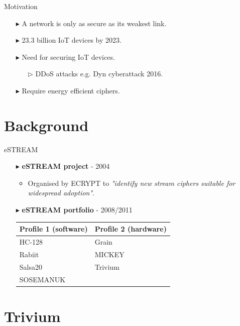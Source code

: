 \documentclass[10pt, compress]{beamer}
\begin{document}
\begin{frame}{Motivation}
\begin{itemize}[itemsep=0.5cm]
\item[$\blacktriangleright$] A network is only as secure as its weakest link.
\item[$\blacktriangleright$] 23.3 billion IoT devices by 2023.
\item[$\blacktriangleright$] Need for securing IoT devices.
\begin{itemize}[itemsep=0.25cm]
\item[$\triangleright$] DDoS attacks e.g. Dyn cyberattack 2016.
\end{itemize}
\item[$\blacktriangleright$] Require energy efficient ciphers.
\end{itemize}
\end{frame}

\section{Background}

\begin{frame}{eSTREAM}
\begin{itemize}[itemsep=0.5cm]
\item[$\blacktriangleright$] \textbf{eSTREAM project} - 2004
\begin{itemize}
\item Organised by ECRYPT to \textit{"identify new stream ciphers suitable for widespread adoption"}.
\end{itemize}
\item[$\blacktriangleright$] \textbf{eSTREAM portfolio} - 2008/2011
\begin{table}
\centering
\begin{tabular}{l|l}
Profile 1 (software) & Profile 2 (hardware)\\\hline
HC-128 & Grain\\
Rabiit & MICKEY\\
Salsa20 & Trivium\\
SOSEMANUK &
\end{tabular}
\end{table}
\end{itemize}
\end{frame}

\section{Trivium}
\end{document}
